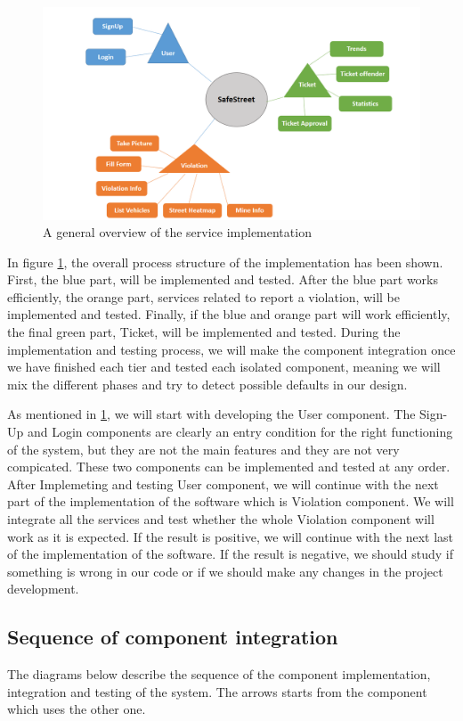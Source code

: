 \begin{figure}
\centering
\includegraphics[width=\textwidth]{Images/ImplemetationandTest.png}
\caption{\label{fig:Test} A general overview of the service implementation}
\end{figure}

In ﬁgure \ref{fig:Test}, the overall process structure of the implementation has been shown. First, the blue part, will be implemented and tested. After the blue part works eﬃciently, the orange part, services related to report a violation, will be implemented and tested. Finally, if the blue and orange part will work eﬃciently, the ﬁnal green part, Ticket, will be implemented and tested. During the implementation and testing process, we will make the component integration once we have ﬁnished each tier and tested each isolated component, meaning we will mix the different phases and try to detect possible defaults in our design.

As mentioned in \ref{fig:Test}, we will start with developing the User component. The Sign-Up and Login components are clearly an entry condition for the right functioning of the system, but they are not the main features and they are not very compicated. These two components can be implemented and tested at any order. After Implemeting and testing User component, we will continue with the next part of the implementation of the software which is Violation component. We will integrate all the services and test whether the whole Violation component will work as it is expected. If the result is positive, we will continue with the next last of the implementation of the software. If the result is negative, we should study if something is wrong in our code or if we should make any changes in the project development.

\subsection{Sequence of component integration}
The diagrams below describe the sequence of the component implementation, integration and testing of the system. The arrows starts from the component which uses the other one.

